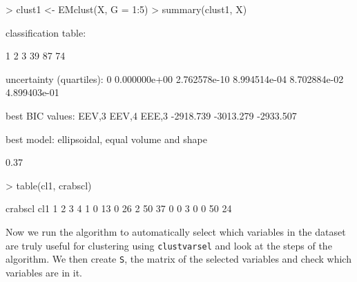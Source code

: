 \documentclass[,12pt]{article}
\newcommand{\Robject}[1]{{\texttt{#1}}}
\newcommand{\Rfunction}[1]{{\texttt{#1}}}
\begin{document}
\begin{Schunk}
\begin{Sinput}
> clust1 <- EMclust(X, G = 1:5)
> summary(clust1, X)
\end{Sinput}
\begin{Soutput}

classification table:

 1  2  3 
39 87 74 

uncertainty (quartiles):
          0%
0.000000e+00 2.762578e-10 8.994514e-04 8.702884e-02 4.899403e-01 

best BIC values:
    EEV,3     EEV,4     EEE,3 
-2918.739 -3013.279 -2933.507 

best model: ellipsoidal, equal volume and shape 


\end{Soutput}
\begin{Soutput}
[1] 0.37

\end{Soutput}
\begin{Sinput}
> table(cl1, crabscl)
\end{Sinput}
\begin{Soutput}
   crabscl
cl1  1  2  3  4
  1  0 13  0 26
  2 50 37  0  0
  3  0  0 50 24

\end{Soutput}
\end{Schunk}
Now we run the algorithm to automatically select which variables in the dataset are truly useful for clustering using \Rfunction{clustvarsel} and look at the steps of the algorithm. We then create \Robject{S}, the matrix of the selected variables and check which variables are in it.
\end{document}
